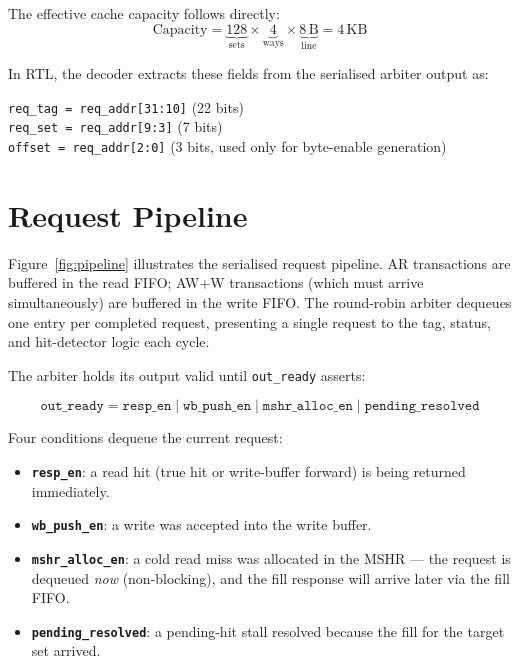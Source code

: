 \documentclass[12pt,letterpaper]{report}
\begin{document}
\noindent
The effective cache capacity follows directly:
\[
  \text{Capacity} = \underbrace{128}_{\text{sets}}
                  \times \underbrace{4}_{\text{ways}}
                  \times \underbrace{8\,\text{B}}_{\text{line}} = 4\,\text{KB}
\]

In RTL, the decoder extracts these fields from the serialised
arbiter output as:
\begin{center}
\texttt{req\_tag = req\_addr[31:10]} \quad (22 bits) \\
\texttt{req\_set = req\_addr[9:3]}   \quad (7 bits)  \\
\texttt{offset  = req\_addr[2:0]}    \quad (3 bits, used only for byte-enable generation)
\end{center}

\section{Request Pipeline}
\label{sec:pipeline}

Figure~\ref{fig:pipeline} illustrates the serialised request pipeline.
AR transactions are buffered in the read FIFO; AW+W transactions (which
must arrive simultaneously) are buffered in the write FIFO.  The
round-robin arbiter dequeues one entry per completed request, presenting
a single request to the tag, status, and hit-detector logic each cycle.

The arbiter holds its output valid until \texttt{out\_ready} asserts:

\[
  \texttt{out\_ready} = \texttt{resp\_en} \mathbin{|} \texttt{wb\_push\_en}
                      \mathbin{|} \texttt{mshr\_alloc\_en}
                      \mathbin{|} \texttt{pending\_resolved}
\]

Four conditions dequeue the current request:
\begin{itemize}
  \item \textbf{\texttt{resp\_en}}: a read hit (true hit or write-buffer
        forward) is being returned immediately.
  \item \textbf{\texttt{wb\_push\_en}}: a write was accepted into the
        write buffer.
  \item \textbf{\texttt{mshr\_alloc\_en}}: a cold read miss was
        allocated in the MSHR --- the request is dequeued \emph{now}
        (non-blocking), and the fill response will arrive later via
        the fill FIFO.
  \item \textbf{\texttt{pending\_resolved}}: a pending-hit stall
        resolved because the fill for the target set arrived.
\end{itemize}
\end{document}
